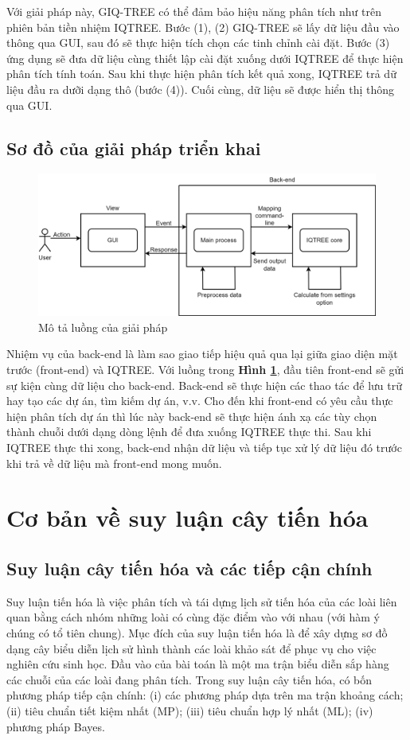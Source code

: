 \documentclass[12pt]{report}
\begin{document}
Với giải pháp này, GIQ-TREE có thể đảm bảo hiệu năng phân tích như trên phiên bản tiền nhiệm IQTREE. Bước (1), (2) GIQ-TREE sẽ lấy dữ liệu đầu vào thông qua GUI, sau đó sẽ thực hiện tích chọn các tinh chỉnh cài đặt. Bước (3) ứng dụng sẽ đưa dữ liệu cùng thiết lập cài đặt xuống dưới IQTREE để thực hiện phân tích tính toán. Sau khi thực hiện phân tích kết quả xong, IQTREE trả dữ liệu đầu ra dưỡi dạng thô (bước (4)). Cuối cùng, dữ liệu sẽ được hiển thị thông qua GUI.

\section{Sơ đồ của giải pháp triển khai}

\begin{figure}[h]
	\centering
	\includegraphics[scale=0.26]{Image/1.4.png}
	\caption{Mô tả luồng của giải pháp}
	\label{fig:image1.4}
\end{figure}

Nhiệm vụ của back-end là làm sao giao tiếp hiệu quả qua lại giữa giao diện mặt trước (front-end) và IQTREE. Với luồng trong \textbf{Hình \ref{fig:image1.4}}, đầu tiên front-end sẽ gửi sự kiện cùng dữ liệu cho back-end. Back-end sẽ thực hiện các thao tác để lưu trữ hay tạo các dự án, tìm kiếm dự án, v.v. Cho đến khi front-end có yêu cầu thực hiện phân tích dự án thì lúc này back-end sẽ thực hiện ánh xạ các tùy chọn thành chuỗi dưới dạng dòng lệnh để đưa xuống IQTREE thực thi. Sau khi IQTREE thực thi xong, back-end nhận dữ liệu và tiếp tục xử lý dữ liệu đó trước khi trả về dữ liệu mà front-end mong muốn.

\newpage	
\chapter{Cơ bản về suy luận cây tiến hóa}
\label{chap:chapter2}
\section{Suy luận cây tiến hóa và các tiếp cận chính }
Suy luận tiến hóa \cite{cia-10} là việc phân tích và tái dựng lịch sử tiến hóa của các loài liên quan bằng cách nhóm những loài có cùng đặc điểm vào với nhau (với hàm ý chúng có tổ tiên chung). Mục đích của suy luận tiến hóa là để xây dựng sơ đồ dạng cây biểu diễn lịch sử hình thành các loài khảo sát để phục vụ cho việc nghiên cứu sinh học. Đầu vào của bài toán là một ma trận biểu diễn sắp hàng các chuỗi của các loài đang phân tích. Trong suy luận cây tiến hóa, có bốn phương pháp tiếp cận chính: (i) các phương pháp dựa trên ma trận khoảng cách; (ii) tiêu chuẩn tiết kiệm nhất (MP); (iii) tiêu chuẩn hợp lý nhất (ML); (iv) phương pháp Bayes.
\end{document}
